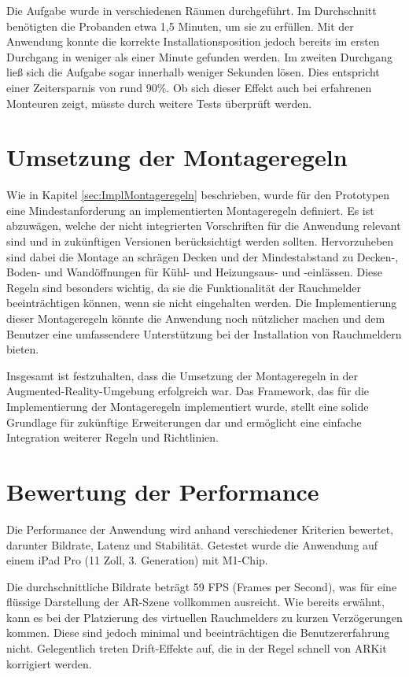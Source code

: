 Die Aufgabe wurde in verschiedenen Räumen durchgeführt. Im Durchschnitt benötigten die Probanden etwa 1,5 Minuten, um sie zu erfüllen. Mit der Anwendung konnte die korrekte Installationsposition jedoch bereits im ersten Durchgang in weniger als einer Minute gefunden werden. Im zweiten Durchgang ließ sich die Aufgabe sogar innerhalb weniger Sekunden lösen. Dies entspricht einer Zeitersparnis von rund 90\%. Ob sich dieser Effekt auch bei erfahrenen Monteuren zeigt, müsste durch weitere Tests überprüft werden.

\section{Umsetzung der Montageregeln}

Wie in Kapitel \ref{sec:ImplMontageregeln} beschrieben, wurde für den Prototypen eine Mindestanforderung an implementierten Montageregeln definiert. Es ist abzuwägen, welche der nicht integrierten Vorschriften für die Anwendung relevant sind und in zukünftigen Versionen berücksichtigt werden sollten. Hervorzuheben sind dabei die Montage an schrägen Decken und der Mindestabstand zu Decken-, Boden- und Wandöffnungen für Kühl- und Heizungsaus- und -einlässen. Diese Regeln sind besonders wichtig, da sie die Funktionalität der Rauchmelder beeinträchtigen können, wenn sie nicht eingehalten werden. Die Implementierung dieser Montageregeln könnte die Anwendung noch nützlicher machen und dem Benutzer eine umfassendere Unterstützung bei der Installation von Rauchmeldern bieten.

Insgesamt ist festzuhalten, dass die Umsetzung der Montageregeln in der Augmented-Reality-Umgebung erfolgreich war. Das Framework, das für die Implementierung der Montageregeln implementiert wurde, stellt eine solide Grundlage für zukünftige Erweiterungen dar und ermöglicht eine einfache Integration weiterer Regeln und Richtlinien.

\section{Bewertung der Performance}

Die Performance der Anwendung wird anhand verschiedener Kriterien bewertet, darunter Bildrate, Latenz und Stabilität. Getestet wurde die Anwendung auf einem iPad Pro (11 Zoll, 3. Generation) mit M1-Chip.

Die durchschnittliche Bildrate beträgt 59 FPS (Frames per Second), was für eine flüssige Darstellung der AR-Szene vollkommen ausreicht. Wie bereits erwähnt, kann es bei der Platzierung des virtuellen Rauchmelders zu kurzen Verzögerungen kommen. Diese sind jedoch minimal und beeinträchtigen die Benutzererfahrung nicht. Gelegentlich treten Drift-Effekte auf, die in der Regel schnell von ARKit korrigiert werden.

